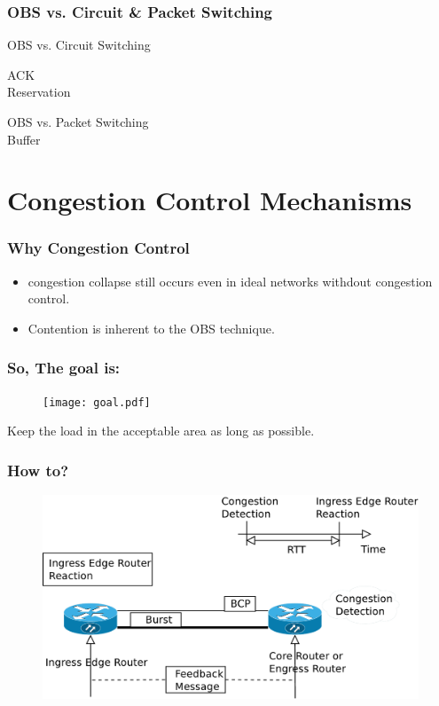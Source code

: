 \documentclass{beamer}
\begin{document}
  \frame
  {
    \frametitle{OBS vs. Circuit \& Packet Switching}
    OBS vs. Circuit Switching
        
    \hspace{5mm}  ACK \\
    \hspace{5mm}  Reservation

    \vspace{10mm}

    OBS vs. Packet Switching \\
    \hspace{5mm}  Buffer
  }

  \section{Congestion Control Mechanisms}

  \frame
  {
    \frametitle{Why Congestion Control}

    \begin{itemize}
    \item<1-> congestion collapse still occurs even in ideal networks withdout congestion control.
    \item<2-> Contention is inherent to the OBS technique.
    \end{itemize}
  }

  \frame
  {
    \frametitle{So, The goal is:}
    
    \begin{figure}
      \scalebox{0.35}
      {
        \texttt{[image: goal.pdf]}
      }
    \end{figure}

    Keep the load in the acceptable area as long as possible. 
  }

  \frame
  {
    \frametitle{How to?}
    \begin{figure}
      \scalebox{0.3}
      {
        \includegraphics{how_to_congestion_control.pdf}
      }
    \end{figure}
  }
\end{document}
